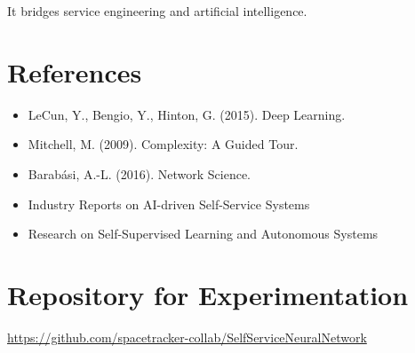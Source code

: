 \documentclass[12pt]{article}
\begin{document}
It bridges service engineering and artificial intelligence.

\section{References}

\begin{itemize}
\item LeCun, Y., Bengio, Y., Hinton, G. (2015). Deep Learning.
\item Mitchell, M. (2009). Complexity: A Guided Tour.
\item Barabási, A.-L. (2016). Network Science.
\item Industry Reports on AI-driven Self-Service Systems
\item Research on Self-Supervised Learning and Autonomous Systems
\end{itemize}

\section{Repository for Experimentation}

\noindent
\url{https://github.com/spacetracker-collab/SelfServiceNeuralNetwork}
\end{document}
